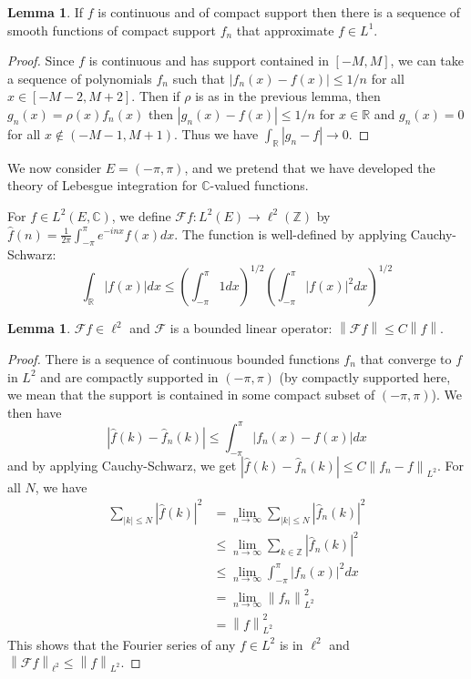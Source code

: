 \documentclass{article}
\newcommand{\Z}{\mathbb{Z}}
\newcommand{\R}{\mathbb{R}}
\newcommand{\C}{\mathbb{C}}
\newcommand{\norm}[1]{\left\|#1\right\|}
\theoremstyle{definition} %
\numberwithin{thm}{section} %
\newtheorem{lemma}[thm]{Lemma}
\theoremstyle{definition} %
\begin{document}
\begin{lemma}
If $f$ is continuous and of compact support then there is a sequence of smooth functions of compact support $f_n$ that approximate $f \in L^1$.
\end{lemma}
\begin{proof}
Since $f$ is continuous and has support contained in $[-M, M]$, we can take a sequence of polynomials $f_n$ such that $|f_n(x) - f(x)| \leq 1/n$ for all $x \in [-M - 2, M + 2]$. Then if $\rho$ is as in the previous lemma, then $g_n(x) = \rho(x)f_n(x)$ then $|g_n(x) - f(x)| \leq 1/n$ for $x \in \R$ and $g_n(x) = 0$ for all $x \notin (-M - 1, M + 1)$. Thus we have $\int_\R |g_n - f| \to 0$.
\end{proof}

We now consider $E = (-\pi, \pi)$, and we pretend that we have developed the theory of Lebesgue integration for $\C$-valued functions.

For $f \in L^2(E, \C)$, we define $\mathcal{F} f: L^2(E) \to \ell^2(\Z)$ by $\hat{f}(n) = \frac{1}{2\pi}\int_{-\pi}^\pi e^{-inx}f(x) dx$. The function is well-defined by applying Cauchy-Schwarz:
\[ \int_\R |f(x)| dx \leq \left(\int_{-\pi}^\pi 1 dx\right)^{1/2}\left(\int_{-\pi}^\pi |f(x)|^2 dx\right)^{1/2} \]

\begin{lemma}
$\mathcal{F}f \in \ell^2$ and $\mathcal{F}$ is a bounded linear operator: $\norm{\mathcal{F}f} \leq C \norm{f}$.
\end{lemma}
\begin{proof}
There is a sequence of continuous bounded functions $f_n$ that converge to $f$ in $L^2$ and are compactly supported in $(-\pi, \pi)$ (by compactly supported here, we mean that the support is contained in some compact subset of $(-\pi, \pi)$). We then have 
\[ |\hat{f}(k) - \hat{f}_n(k)| \leq \int_{-\pi}^\pi |f_n(x) - f(x)| dx \]
and by applying Cauchy-Schwarz, we get $|\hat{f}(k) - \hat{f}_n(k)| \leq C\norm{f_n - f}_{L^2}$. For all $N$, we have
\begin{align*}
    \sum_{|k| \leq N} |\hat{f}(k)|^2
    &= \lim_{n \to \infty} \sum_{|k| \leq N} |\hat{f}_n(k)|^2 \\
    &\leq \lim_{n \to \infty} \sum_{k \in \Z} |\hat{f}_n(k)|^2 \\
    &\leq \lim_{n \to \infty} \int_{-\pi}^\pi |f_n(x)|^2 dx \\
    &= \lim_{n \to \infty} \norm{f_n}_{L^2}^2 \\
    &= \norm{f}_{L^2}^2
\end{align*}
This shows that the Fourier series of any $f \in L^2$ is in $\ell^2$ and $\norm{\mathcal{F}f}_{\ell^2} \leq \norm{f}_{L^2}$.
\end{proof}
\end{document}
